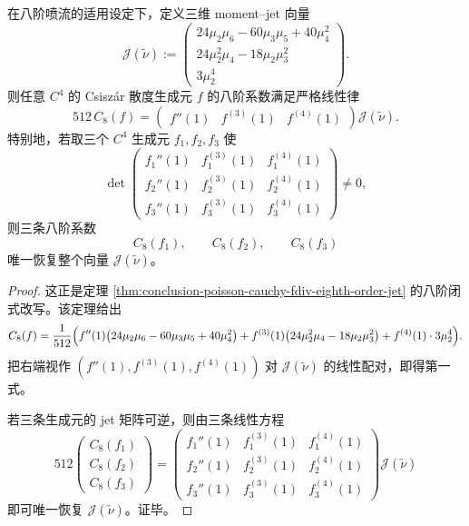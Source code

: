 \begin{theorem}\label{thm:conclusion-poisson-cauchy-eighth-jet-linear-tomography}
在八阶喷流的适用设定下，定义三维 moment--jet 向量
\[
\mathcal J(\tilde\nu):=
\begin{pmatrix}
24\mu_2\mu_6-60\mu_3\mu_5+40\mu_4^2\\[1mm]
24\mu_2^2\mu_4-18\mu_2\mu_3^2\\[1mm]
3\mu_2^4
\end{pmatrix}.
\]
则任意 \(C^4\) 的 Csisz\'ar 散度生成元 \(f\) 的八阶系数满足严格线性律
\[
512\,C_8(f)
=
\begin{pmatrix}
f''(1)& f^{(3)}(1)& f^{(4)}(1)
\end{pmatrix}
\mathcal J(\tilde\nu).
\]
特别地，若取三个 \(C^4\) 生成元 \(f_1,f_2,f_3\) 使
\[
\det
\begin{pmatrix}
f_1''(1)&f_1^{(3)}(1)&f_1^{(4)}(1)\\
f_2''(1)&f_2^{(3)}(1)&f_2^{(4)}(1)\\
f_3''(1)&f_3^{(3)}(1)&f_3^{(4)}(1)
\end{pmatrix}\neq0,
\]
则三条八阶系数
\[
C_8(f_1),\qquad C_8(f_2),\qquad C_8(f_3)
\]
唯一恢复整个向量 \(\mathcal J(\tilde\nu)\)。
\end{theorem}
\begin{proof}
这正是定理 \ref{thm:conclusion-poisson-cauchy-fdiv-eighth-order-jet} 的八阶闭式改写。该定理给出
\[
C_8(f)
=
\frac1{512}\Bigl(
f''(1)\bigl(24\mu_2\mu_6-60\mu_3\mu_5+40\mu_4^2\bigr)
+f^{(3)}(1)\bigl(24\mu_2^2\mu_4-18\mu_2\mu_3^2\bigr)
+f^{(4)}(1)\cdot 3\mu_2^4
\Bigr).
\]
把右端视作 \((f''(1),f^{(3)}(1),f^{(4)}(1))\) 对 \(\mathcal J(\tilde\nu)\) 的线性配对，即得第一式。

若三条生成元的 jet 矩阵可逆，则由三条线性方程
\[
512
\begin{pmatrix}
C_8(f_1)\\
C_8(f_2)\\
C_8(f_3)
\end{pmatrix}
=
\begin{pmatrix}
f_1''(1)&f_1^{(3)}(1)&f_1^{(4)}(1)\\
f_2''(1)&f_2^{(3)}(1)&f_2^{(4)}(1)\\
f_3''(1)&f_3^{(3)}(1)&f_3^{(4)}(1)
\end{pmatrix}
\mathcal J(\tilde\nu)
\]
即可唯一恢复 \(\mathcal J(\tilde\nu)\)。证毕。
\end{proof}

